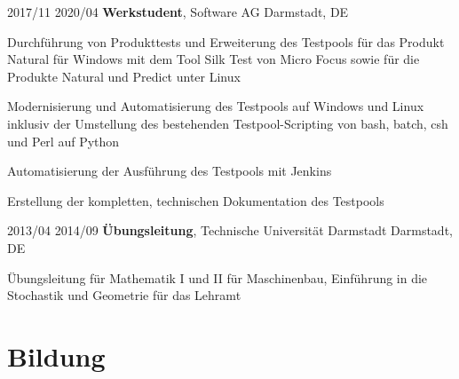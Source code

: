 \documentclass{maxcv}
\begin{document}
\vspace{0.2 cm}

\begin{twocolentry}{2017/11 \dash{} 2020/04}
    \textbf{Werkstudent}, Software AG \dash{} Darmstadt, DE
\end{twocolentry}
\vspace{0.10 cm}
\begin{onecolentry}
    \begin{highlights}
        \item Durchführung von Produkttests und Erweiterung des Testpools für das Produkt Natural für Windows mit dem Tool Silk Test von Micro Focus sowie für die Produkte Natural und Predict unter Linux
        \item Modernisierung und Automatisierung des Testpools auf Windows und Linux inklusiv der Umstellung des bestehenden Testpool-Scripting von bash, batch, csh und Perl auf Python
        \item Automatisierung der Ausführung des Testpools mit Jenkins
        \item Erstellung der kompletten, technischen Dokumentation des Testpools
    \end{highlights}
\end{onecolentry}

\vspace{0.2 cm}

\begin{twocolentry}{2013/04 \dash{} 2014/09}
    \textbf{Übungsleitung}, Technische Universität Darmstadt \dash{} Darmstadt, DE
\end{twocolentry}
\vspace{0.10 cm}
\begin{onecolentry}
    \begin{highlights}
        \item Übungsleitung für Mathematik I und II für Maschinenbau, Einführung in die Stochastik und Geometrie für das Lehramt
    \end{highlights}
\end{onecolentry}


\section{Bildung}
\end{document}
